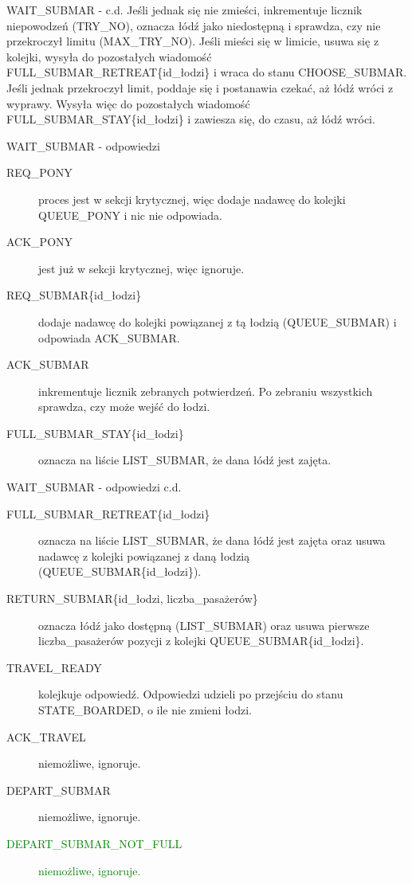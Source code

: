 \documentclass{beamer}
\begin{document}
\begin{frame}{WAIT\_SUBMAR - c.d.}
    \internallinenumbers
    \resetlinenumber[1]
    Jeśli jednak się nie zmieści, inkrementuje licznik niepowodzeń (TRY\_NO), oznacza łódź jako niedostępną i sprawdza, czy nie przekroczył limitu (MAX\_TRY\_NO). Jeśli mieści się w limicie, usuwa się z kolejki, wysyła do pozostałych wiadomość FULL\_SUBMAR\_RETREAT\{id\_łodzi\} i wraca do stanu CHOOSE\_SUBMAR. Jeśli jednak przekroczył limit, poddaje się i postanawia czekać, aż łódź wróci z wyprawy. Wysyła więc do pozostałych wiadomość FULL\_SUBMAR\_STAY\{id\_łodzi\} i zawiesza się, do czasu, aż łódź wróci.
\end{frame}

\begin{frame}{WAIT\_SUBMAR - odpowiedzi}
    \internallinenumbers
    \resetlinenumber[1]
    \begin{description}
        \item [REQ\_PONY] proces jest w sekcji krytycznej, więc dodaje nadawcę do kolejki QUEUE\_PONY i nic nie odpowiada. 
        \item [ACK\_PONY] jest już w sekcji krytycznej, więc ignoruje.
        \item [REQ\_SUBMAR\{id\_łodzi\}] dodaje nadawcę do kolejki powiązanej z tą łodzią (QUEUE\_SUBMAR) i odpowiada ACK\_SUBMAR.
        \item [ACK\_SUBMAR] inkrementuje licznik zebranych potwierdzeń. Po zebraniu wszystkich sprawdza, czy może wejść do łodzi.
        \item [FULL\_SUBMAR\_STAY\{id\_łodzi\}] oznacza na liście LIST\_SUBMAR, że dana łódź jest zajęta.

    \end{description}
\end{frame}

\begin{frame}{WAIT\_SUBMAR - odpowiedzi c.d.}
    \internallinenumbers
    \resetlinenumber[1]
    \begin{description}
        \item [FULL\_SUBMAR\_RETREAT\{id\_łodzi\}] oznacza na liście LIST\_SUBMAR, że dana łódź jest zajęta oraz usuwa nadawcę z kolejki powiązanej z daną łodzią (QUEUE\_SUBMAR\{id\_łodzi\}).
        \item [RETURN\_SUBMAR\{id\_łodzi, liczba\_pasażerów\}] oznacza łódź jako dostępną (LIST\_SUBMAR) oraz usuwa pierwsze liczba\_pasażerów pozycji z kolejki QUEUE\_SUBMAR\{id\_łodzi\}.
        \item [TRAVEL\_READY] kolejkuje odpowiedź. Odpowiedzi udzieli po przejściu do stanu STATE\_BOARDED, o ile nie zmieni łodzi.
        \item [ACK\_TRAVEL] niemożliwe, ignoruje.
        \item [DEPART\_SUBMAR] niemożliwe, ignoruje.
        \item [\textcolor{green}{DEPART\_SUBMAR\_NOT\_FULL}] \textcolor{green}{niemożliwe, ignoruje.}
    \end{description}
\end{frame}
\end{document}
